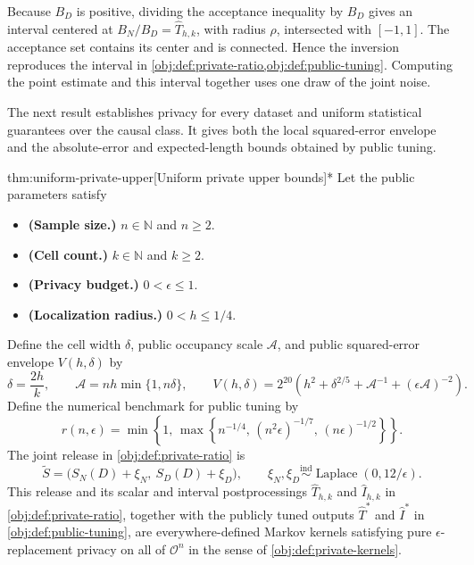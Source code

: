 \documentclass[11pt]{article}
\begin{document}
Because \(B_D\) is positive, dividing the acceptance inequality by \(B_D\) gives an interval centered at \(B_N/B_D=\widehat T_{h,k}\), with radius \(\rho\), intersected with \([-1,1]\). The acceptance set contains its center and is connected. Hence the inversion reproduces the interval in \cref{obj:def:private-ratio,obj:def:public-tuning}. Computing the point estimate and this interval together uses one draw of the joint noise.

The next result establishes privacy for every dataset and uniform statistical guarantees over the causal class. It gives both the local squared-error envelope and the absolute-error and expected-length bounds obtained by public tuning.
\begin{theoremv}{thm:uniform-private-upper}[Uniform private upper bounds]*
Let the public parameters satisfy
\begin{itemize}
\item \textbf{(Sample size.)} \(n\in\mathbb N\) and \(n\ge2\).
\item \textbf{(Cell count.)} \(k\in\mathbb N\) and \(k\ge2\).
\item \textbf{(Privacy budget.)} \(0<\epsilon\le1\).
\item \textbf{(Localization radius.)} \(0<h\le1/4\).
\end{itemize}
Define the cell width \(\delta\), public occupancy scale \(\mathcal A\), and public squared-error envelope \(V(h,\delta)\) by
\[
\delta=\frac{2h}{k},
\qquad
\mathcal A=nh\min\{1,n\delta\},
\qquad
V(h,\delta)=2^{20}\left(
h^2+\delta^{2/5}+\mathcal A^{-1}+(\epsilon\mathcal A)^{-2}
\right).
\]
Define the numerical benchmark for public tuning by
\[
r(n,\epsilon)=
\min\left\{1,\,
\max\left\{
n^{-1/4},\,
(n^2\epsilon)^{-1/7},\,
(n\epsilon)^{-1/2}
\right\}\right\}.
\]
The joint release in \cref{obj:def:private-ratio} is
\[
\widetilde S=
\bigl(S_N(D)+\xi_N,\ S_D(D)+\xi_D\bigr),
\qquad
\xi_N,\xi_D\overset{\mathrm{ind}}{\sim}
\operatorname{Laplace}(0,12/\epsilon).
\]
This release and its scalar and interval postprocessings
\(\widehat T_{h,k}\) and \(\widehat I_{h,k}\) in
\cref{obj:def:private-ratio}, together with the publicly tuned outputs
\(\widehat T^*\) and \(\widehat I^*\) in \cref{obj:def:public-tuning},
are everywhere-defined Markov kernels satisfying pure
\(\epsilon\)-replacement privacy on all of \(\mathcal O^n\) in the sense of
\cref{obj:def:private-kernels}.


\end{theoremv}
\end{document}
